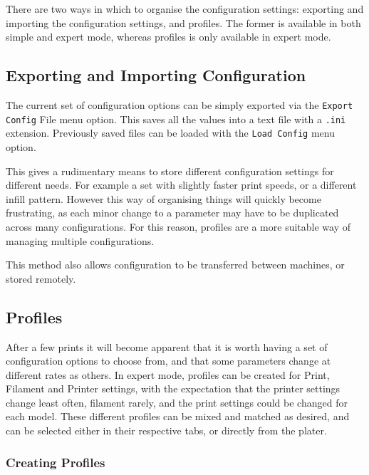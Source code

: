 
There are two ways in which to organise the configuration settings: exporting and importing the configuration settings, and profiles.  The former is available in both simple and expert mode, whereas profiles is only available in expert mode.

\subsection{Exporting and Importing Configuration} %
\label{sub:exporting_and_importing_configuration}

The current set of configuration options can be simply exported via the \texttt{Export Config} File menu option. This saves all the values into a text file with a \texttt{.ini} extension.  Previously saved files can be loaded with the \texttt{Load Config} menu option.

This gives a rudimentary means to store different configuration settings for different needs.  For example a set with slightly faster print speeds, or a different infill pattern.  However this way of organising things will quickly become frustrating, as each minor change to a parameter may have to be duplicated across many configurations.  For this reason, profiles are a more suitable way of managing multiple configurations.

This method also allows configuration to be transferred between machines, or stored remotely.



\subsection{Profiles} %
\label{sec:profiles}

After a few prints it will become apparent that it is worth having a set of configuration options to choose from, and that some parameters change at different rates as others.  In expert mode, profiles can be created for Print, Filament and Printer settings, with the expectation that the printer settings change least often, filament rarely, and the print settings could be changed for each model.  These different profiles can be mixed and matched as desired, and can be selected either in their respective tabs, or directly from the plater.

\subsubsection{Creating Profiles} %
\label{sub:creating_profiles}

